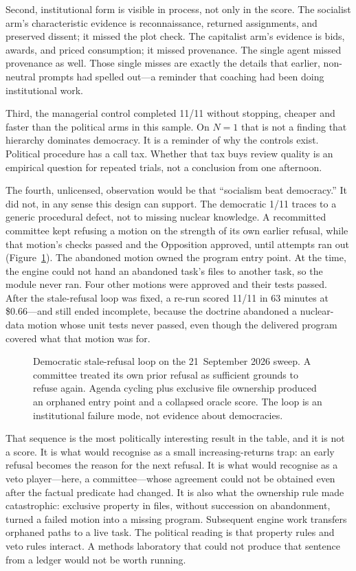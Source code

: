\documentclass[11pt,a4paper]{article}
\begin{document}
Second, institutional form is visible in process, not only in the score. The socialist
arm's characteristic evidence is reconnaissance, returned assignments, and preserved
dissent; it missed the plot check. The capitalist arm's evidence is bids, awards, and
priced consumption; it missed provenance. The single agent missed provenance as well.
Those single misses are exactly the details that earlier, non-neutral prompts had spelled
out---a reminder that coaching had been doing institutional work.

Third, the managerial control completed 11/11 without stopping, cheaper and faster than
the political arms in this sample. On $N{=}1$ that is not a finding that hierarchy
dominates democracy. It is a reminder of why the controls exist. Political procedure has
a call tax. Whether that tax buys review quality is an empirical question for repeated
trials, not a conclusion from one afternoon.

The fourth, unlicensed, observation would be that ``socialism beat democracy.'' It did
not, in any sense this design can support. The democratic 1/11 traces to a generic
procedural defect, not to missing nuclear knowledge. A recommitted committee kept
refusing a motion on the strength of its own earlier refusal, while that motion's checks
passed and the Opposition approved, until attempts ran out (Figure~\ref{fig:stale}).
The abandoned motion owned the program entry point. At the time, the engine could not
hand an abandoned task's files to another task, so the module never ran. Four other
motions were approved and their tests passed. After the stale-refusal loop was fixed,
a re-run scored 11/11 in 63 minutes at \$0.66---and still ended incomplete, because the
doctrine abandoned a nuclear-data motion whose unit tests never passed, even though the
delivered program covered what that motion was for.

\begin{figure}[t]
\centering

\caption{Democratic stale-refusal loop on the 21~September 2026 sweep. A committee
treated its own prior refusal as sufficient grounds to refuse again. Agenda cycling
plus exclusive file ownership produced an orphaned entry point and a collapsed oracle
score. The loop is an institutional failure mode, not evidence about democracies.}
\label{fig:stale}
\end{figure}

That sequence is the most politically interesting result in the table, and it is not a
score. It is what \citet{pierson2000} would recognise as a small increasing-returns trap:
an early refusal becomes the reason for the next refusal. It is what
\citet{tsebelis2002} would recognise as a veto player---here, a committee---whose
agreement could not be obtained even after the factual predicate had changed. It is also
what the ownership rule made catastrophic: exclusive property in files, without
succession on abandonment, turned a failed motion into a missing program. Subsequent
engine work transfers orphaned paths to a live task. The political reading is that
property rules and veto rules interact. A methods laboratory that could not produce
that sentence from a ledger would not be worth running.
\end{document}

